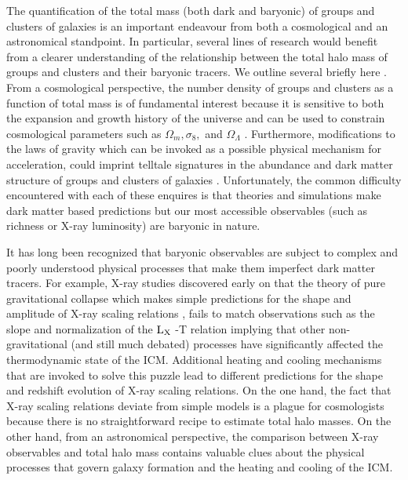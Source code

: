 \documentclass[12pt]{emulateapj}
\newcommand{\lx}{$\rm{L}_{\rm X}$ }
\newcommand{\eg}{{\it e.g.}}
\begin{document}
The quantification of the total mass (both dark and baryonic) of
groups and clusters of galaxies is an important endeavour from both a
cosmological and an astronomical standpoint. In particular, several
lines of research would benefit from a clearer understanding of the
relationship between the total halo mass of groups and clusters and
their baryonic tracers. We outline several briefly here \citep[for a
recent review on this subject see][]{Voit:2005}. From a cosmological
perspective, the number density of groups and clusters as a function
of total mass is of fundamental interest because it is sensitive to
both the expansion and growth history of the universe and can be used
to constrain cosmological parameters such as $\Omega_m, \sigma_8,$ and
$\Omega_{\Lambda}$
\citep[\eg][]{White:1993,Wang:1998a,Haiman:2001,Rozo:2004, Wang:2004a,
  Bahcall:2004, Rozo:2009}. Furthermore, modifications to the laws of
gravity which can be invoked as a possible physical mechanism for
acceleration, could imprint telltale signatures in the abundance and
dark matter structure of groups and clusters of galaxies
\citep[][]{Rapetti:2008,Schmidt:2008}. Unfortunately, the common
difficulty encountered with each of these enquires is that theories
and simulations make dark matter based predictions but our most
accessible observables (such as richness or X-ray luminosity) are
baryonic in nature.

It has long been recognized that baryonic observables are subject to
complex and poorly understood physical processes that make them
imperfect dark matter tracers. For example, X-ray studies discovered
early on that the theory of pure gravitational collapse which makes
simple predictions for the shape and amplitude of X-ray scaling
relations \citep[also known as the {\it self-similar
  model,}][]{Kaiser:1986}, fails to match observations such as the
slope and normalization of the \lx-T relation \citep[][and references
therein]{Voit:2005} implying that other non-gravitational (and still
much debated) processes have significantly affected the thermodynamic
state of the ICM. Additional heating and cooling mechanisms that are
invoked to solve this puzzle lead to different predictions for the
shape and redshift evolution of X-ray scaling relations. On the one
hand, the fact that X-ray scaling relations deviate from simple models
is a plague for cosmologists because there is no straightforward
recipe to estimate total halo masses. On the other hand, from an
astronomical perspective, the comparison between X-ray observables and
total halo mass contains valuable clues about the physical processes
that govern galaxy formation and the heating and cooling of the ICM.
\end{document}
